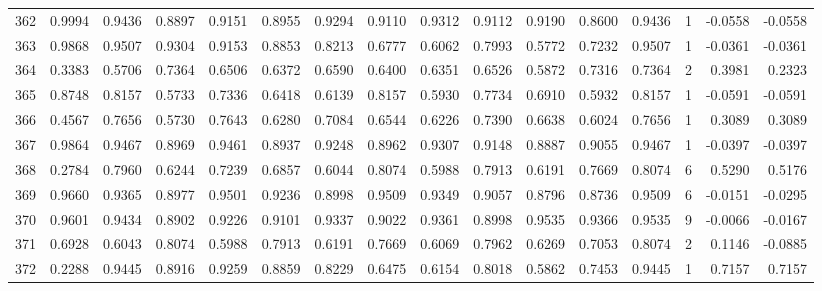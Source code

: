 \begin{tabular}{lrrrrrrrrrrrrrrr}
362 &      0.9994 &  0.9436 &  0.8897 &  0.9151 &  0.8955 &  0.9294 &  0.9110 &  0.9312 &  0.9112 &  0.9190 &   0.8600 &     0.9436 &      1 &                   -0.0558 &                    -0.0558 \\
363 &      0.9868 &  0.9507 &  0.9304 &  0.9153 &  0.8853 &  0.8213 &  0.6777 &  0.6062 &  0.7993 &  0.5772 &   0.7232 &     0.9507 &      1 &                   -0.0361 &                    -0.0361 \\
364 &      0.3383 &  0.5706 &  0.7364 &  0.6506 &  0.6372 &  0.6590 &  0.6400 &  0.6351 &  0.6526 &  0.5872 &   0.7316 &     0.7364 &      2 &                    0.3981 &                     0.2323 \\
365 &      0.8748 &  0.8157 &  0.5733 &  0.7336 &  0.6418 &  0.6139 &  0.8157 &  0.5930 &  0.7734 &  0.6910 &   0.5932 &     0.8157 &      1 &                   -0.0591 &                    -0.0591 \\
366 &      0.4567 &  0.7656 &  0.5730 &  0.7643 &  0.6280 &  0.7084 &  0.6544 &  0.6226 &  0.7390 &  0.6638 &   0.6024 &     0.7656 &      1 &                    0.3089 &                     0.3089 \\
367 &      0.9864 &  0.9467 &  0.8969 &  0.9461 &  0.8937 &  0.9248 &  0.8962 &  0.9307 &  0.9148 &  0.8887 &   0.9055 &     0.9467 &      1 &                   -0.0397 &                    -0.0397 \\
368 &      0.2784 &  0.7960 &  0.6244 &  0.7239 &  0.6857 &  0.6044 &  0.8074 &  0.5988 &  0.7913 &  0.6191 &   0.7669 &     0.8074 &      6 &                    0.5290 &                     0.5176 \\
369 &      0.9660 &  0.9365 &  0.8977 &  0.9501 &  0.9236 &  0.8998 &  0.9509 &  0.9349 &  0.9057 &  0.8796 &   0.8736 &     0.9509 &      6 &                   -0.0151 &                    -0.0295 \\
370 &      0.9601 &  0.9434 &  0.8902 &  0.9226 &  0.9101 &  0.9337 &  0.9022 &  0.9361 &  0.8998 &  0.9535 &   0.9366 &     0.9535 &      9 &                   -0.0066 &                    -0.0167 \\
371 &      0.6928 &  0.6043 &  0.8074 &  0.5988 &  0.7913 &  0.6191 &  0.7669 &  0.6069 &  0.7962 &  0.6269 &   0.7053 &     0.8074 &      2 &                    0.1146 &                    -0.0885 \\
372 &      0.2288 &  0.9445 &  0.8916 &  0.9259 &  0.8859 &  0.8229 &  0.6475 &  0.6154 &  0.8018 &  0.5862 &   0.7453 &     0.9445 &      1 &                    0.7157 &                     0.7157 \\

\end{tabular}
